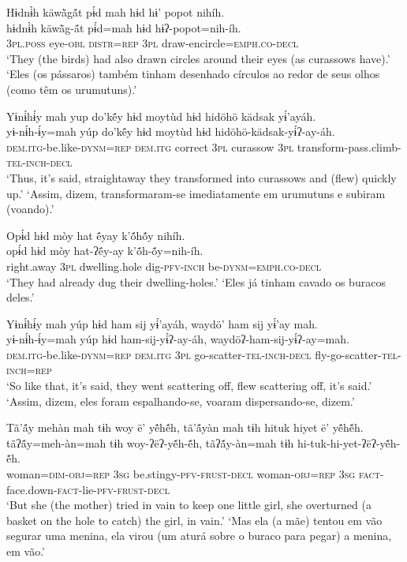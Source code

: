 \documentclass[output=paper,
modfonts,nonflat
]{langsci/langscibook}
\begin{document}
\ea  Hɨdnɨ̀h käwä̀gä́t pɨ́d mah hɨd hɨ’ popot nihíh.\\
\gll hɨdnɨ̀h käwä̀g-ä́t pɨ́d=mah hɨd hɨʔ-popot=nih-íh.\\
     \textsc{3pl.poss} eye\textsc{-obl} \textsc{distr=rep} \textsc{3pl} draw-encircle\textsc{=emph.co-decl}\\
\glt ‘They (the birds) had also drawn circles around their eyes (as curassows have).'{\footnotemark}
\glt ‘Eles (os pássaros) também tinham desenhado círculos ao redor de seus olhos (como têm os urumutuns).'
\z

\ea  Yɨnɨ́hɨ́y mah yup do’kë́y hɨd moytùd hɨd hidöhö kädsak yɨ́’ayáh.\\
\gll yɨ-nɨ́h-ɨ́y=mah yúp do’kë́y hɨd moytùd hɨd hidöhö-kädsak-yɨ́ʔ-ay-áh.\\
     \textsc{dem.itg-}be.like\textsc{-dynm=rep} \textsc{dem.itg} correct \textsc{3pl} curassow \textsc{3pl} transform-pass.climb\textsc{-tel-inch-decl}\\
\glt ‘Thus, it’s said, straightaway they transformed into curassows and (flew) quickly up.'
\glt ‘Assim, dizem, transformaram-se imediatamente em urumutuns e subiram (voando).'
\z

\ea  Opɨ́d hɨd mòy hat ë́yay k’ṍhṍy nihíh.\\
\gll opɨ́d hɨd mòy hat-ʔë́y-ay k’ṍh-ṍy=nih-íh.\\
     right.away \textsc{3pl} dwelling.hole dig\textsc{-pfv-inch} be\textsc{-dynm=emph.co-decl}\\
\glt ‘They had already dug their dwelling-holes.'
\glt ‘Eles já tinham cavado os buracos deles.'
\z

\ea  Yɨnɨ́hɨ́y mah yúp hɨd ham sij yɨ́’ayáh, waydö’ ham sij yɨ́’ay mah.\\
\gll yɨ-nɨ́h-ɨ́y=mah yúp hɨd ham-sij-yɨ́ʔ-ay-áh, waydöʔ-ham-sij-yɨ́ʔ-ay=mah.\\
     \textsc{dem.itg-}be.like\textsc{-dynm=rep} \textsc{dem.itg} \textsc{3pl} go-scatter\textsc{-tel-inch-decl} fly-go-scatter\textsc{-tel-inch=rep}\\
\glt ‘So like that, it’s said, they went scattering off, flew scattering off, it's said.'
\glt ‘Assim, dizem, eles foram espalhando-se, voaram dispersando-se, dizem.'
\z

\ea  Tã’ã́y mehàn mah tɨh woy ë’ yẽ́hẽ́h, tã’ã́yàn mah tɨh hituk hiyet ë’ yẽ́hẽ́h.\\
\gll tãʔã́y=meh-àn=mah tɨh woy-ʔëʔ-yẽ́h-ẽ́h, tãʔã́y-àn=mah tɨh hi-tuk-hi-yet-ʔëʔ-yẽ́h-ẽ́h.\\
     woman\textsc{=dim-obj=rep} \textsc{3sg} be.stingy\textsc{-pfv-frust-decl} woman\textsc{-obj=rep} \textsc{3sg} \textsc{fact-}face.down\textsc{-fact-}lie\textsc{-pfv-frust-decl}\\
\glt ‘But she (the mother) tried in vain to keep one little girl, she overturned (a basket on the hole to catch) the girl, in vain.'
\glt ‘Mas ela (a mãe) tentou em vão segurar uma menina, ela virou (um aturá sobre o buraco para pegar) a menina, em vão.'
\z
\end{document}
